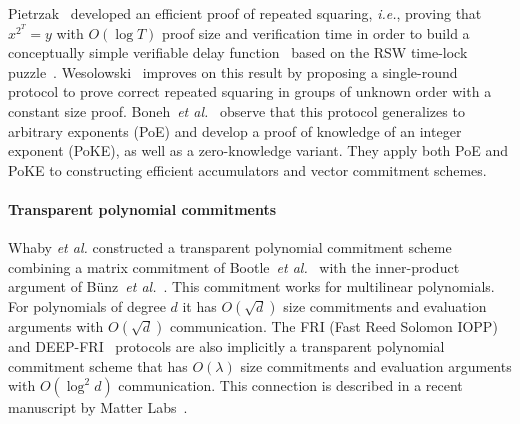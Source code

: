 Pietrzak~\cite{ITCS:Pietrzak18} developed an efficient proof of repeated squaring, \emph{i.e.}, proving that $x^{2^T} = y$ with $O(\log T)$ proof size and verification time in order to build a conceptually simple verifiable delay function~\cite{C:BBBF18} based on the RSW time-lock puzzle~\cite{RivShaWag96}. Wesolowski~\cite{EC:Wesolowski19} improves on this result by proposing a single-round protocol to prove correct repeated squaring in groups of unknown order with a constant size proof. Boneh~\emph{et al.}~\cite{C:BonBunFis19} observe that this protocol generalizes to arbitrary exponents (PoE) and develop a proof of knowledge of an integer exponent (PoKE), as well as a zero-knowledge variant. They apply both PoE and PoKE to constructing efficient accumulators and vector commitment schemes.

\paragraph{Transparent polynomial commitments} 
Whaby \emph{et al.} constructed a transparent polynomial commitment scheme~\cite{SP:WTSTW18} combining a matrix commitment of Bootle~\emph{et al.}~\cite{EC:BCCGP16} with the inner-product argument of B\"{u}nz~\emph{et al.}~\cite{SP:BBBPWM18}. This commitment works for multilinear polynomials. For polynomials of degree $d$ it has $O(\sqrt{d})$ size commitments and evaluation arguments with $O(\sqrt{d})$ communication. 
The  FRI (Fast Reed Solomon IOPP)~\cite{ICALP:BBHR18} and DEEP-FRI~\cite{ECCC:BGKS19} protocols are also implicitly a transparent polynomial commitment scheme that has $O(\lambda)$ size commitments and evaluation arguments with $O(\log^2 d)$ communication. This connection is described in a recent manuscript by Matter Labs~\cite{MatterLabs}. 

